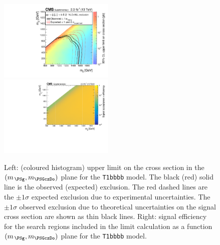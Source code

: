 \clearpage
\begin{figure}[!h]
  \begin{center}
    \includegraphics[width=0.49\textwidth]{Supplementary/RA1T1bbbbXSEC_aux} \, 
    \includegraphics[width=0.49\textwidth]{Supplementary/T1bbbb_merging_4_cats_aux} \,     
  \end{center}
  \caption{Left: (coloured histogram) upper limit on the cross section in the $(m_{\,\PSg}, m_{\PSGczDo})$ plane for the \texttt{T1bbbb} model. 
  The black (red) solid line is the observed (expected) exclusion. The red dashed lines are the $\pm1\sigma$ expected exclusion due to experimental uncertainties. 
  The $\pm1\sigma$ observed exclusion due to theoretical uncertainties on the signal cross section are shown as thin black lines. 
  Right: signal efficiency for the search regions included in the limit calculation as a function $(m_{\,\PSg}, m_{\PSGczDo})$ plane for the \texttt{T1bbbb} model. 
  \label{fig:T1bbbb_excl}}
\end{figure}

